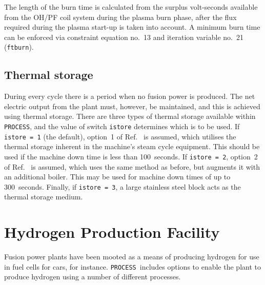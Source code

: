 \documentclass[11pt,a4paper]{report}
\newcommand{\process}{\mbox{\texttt{PROCESS}}}
\begin{document}
The length of the burn time is calculated from the surplus volt-seconds
available from the OH/PF coil system during the plasma burn phase, after the
flux required during the plasma start-up is taken into account. A minimum burn
time can be enforced via constraint equation no.\ 13 and iteration variable
no.\ 21 (\texttt{ftburn}).

\subsection{Thermal storage}

During every cycle there is a period when no fusion power is produced. The net
electric output from the plant must, however, be maintained, and this is
achieved using thermal storage. There are three types of thermal storage
available within \process, and the value of switch \texttt{istore} determines
which is to be used. If \texttt{istore = 1} (the default), option~1 of
Ref.~\cite{ELECTROWATT} is assumed, which utilises the thermal storage
inherent in the machine's steam cycle equipment. This should be used if the
machine down time is less than 100~seconds. If \texttt{istore = 2}, option~2
of Ref.~\cite{ELECTROWATT} is assumed, which uses the same method as before,
but augments it with an additional boiler. This may be used for machine down
times of up to 300~seconds. Finally, if \texttt{istore = 3}, a large stainless
steel block acts as the thermal storage medium.

\section{Hydrogen Production Facility}
\label{sec:hplant}

Fusion power plants have been mooted as a means of producing hydrogen for use
in fuel cells for cars, for instance. \process\ includes options to enable
the plant to produce hydrogen using a number of different processes.
\end{document}
